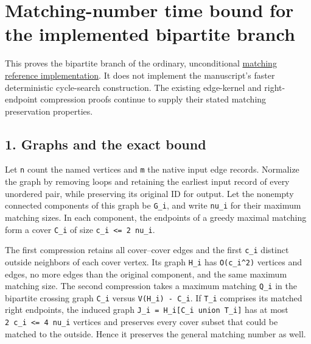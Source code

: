 
\hypertarget{af-4c656876fd-matching-number-time-bound-for-the-implemented-bipartite-branch}{%
\section{Matching-number time bound for the implemented bipartite branch}\label{af-4c656876fd-matching-number-time-bound-for-the-implemented-bipartite-branch}}

This proves the bipartite branch of the ordinary, unconditional \href{https://github.com/icekylinx/algorithm-frontier/blob/main/problems/general-matching/reference/matching.py}{matching reference implementation}. It does not implement the manuscript's faster deterministic cycle-search construction. The existing edge-kernel and right-endpoint compression proofs continue to supply their stated matching preservation properties.

\hypertarget{af-4c656876fd-graphs-and-the-exact-bound}{%
\subsection{1. Graphs and the exact bound}\label{af-4c656876fd-graphs-and-the-exact-bound}}

Let \texttt{n} count the named vertices and \texttt{m} the native input edge records. Normalize the graph by removing loops and retaining the earliest input record of every unordered pair, while preserving its original ID for output. Let the nonempty connected components of this graph be \texttt{G\_i}, and write \texttt{nu\_i} for their maximum matching sizes. In each component, the endpoints of a greedy maximal matching form a cover \texttt{C\_i} of size \texttt{c\_i\ \textless{}=\ 2\ nu\_i}.

The first compression retains all cover--cover edges and the first \texttt{c\_i} distinct outside neighbors of each cover vertex. Its graph \texttt{H\_i} has \texttt{O(c\_i\^{}2)} vertices and edges, no more edges than the original component, and the same maximum matching size. The second compression takes a maximum matching \texttt{Q\_i} in the bipartite crossing graph \texttt{C\_i} versus \texttt{V(H\_i)\ -\ C\_i}. If \texttt{T\_i} comprises its matched right endpoints, the induced graph \texttt{J\_i\ =\ H\_i{[}C\_i\ union\ T\_i{]}} has at most \texttt{2\ c\_i\ \textless{}=\ 4\ nu\_i} vertices and preserves every cover subset that could be matched to the outside. Hence it preserves the general matching number as well.

